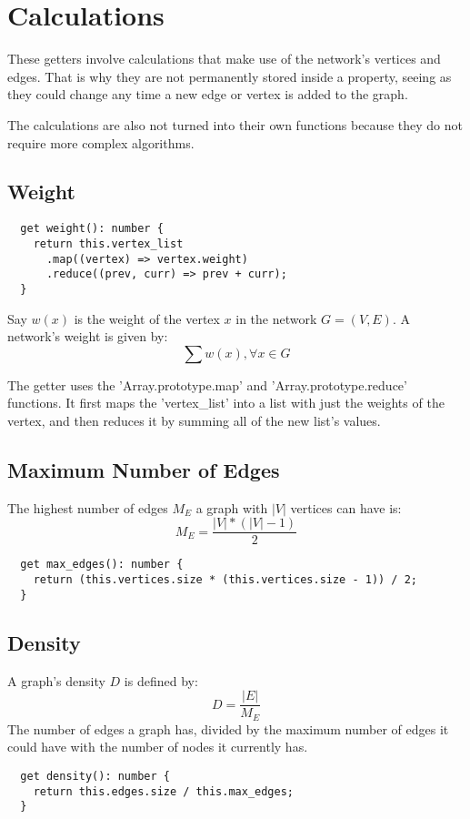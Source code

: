 \section{Calculations}

These getters involve calculations that make use of the network's vertices and edges. That is why they are not permanently stored inside a property, seeing as they could change any time a new edge or vertex is added to the graph.

The calculations are also not turned into their own functions because they do not require more complex algorithms.

\subsection{Weight}

\begin{verbatim}
  get weight(): number {
    return this.vertex_list
      .map((vertex) => vertex.weight)
      .reduce((prev, curr) => prev + curr);
  }
\end{verbatim}

Say $w(x)$ is the weight of the vertex $x$ in the network $G=(V,E)$. A network's weight is given by:
$$\sum{w(x)}, \forall x \in G$$

The getter uses the 'Array.prototype.map' and 'Array.prototype.reduce' functions. It first maps the 'vertex\_list' into a list with just the weights of the vertex, and then reduces it by summing all of the new list's values.

\subsection{Maximum Number of Edges}
The highest number of edges $M_E$ a graph with $|V|$ vertices can have is:
$$M_E=\frac{|V|*(|V|-1)}{2}$$

\begin{verbatim}
  get max_edges(): number {
    return (this.vertices.size * (this.vertices.size - 1)) / 2;
  }
\end{verbatim}

\subsection{Density}

A graph's density $D$ is defined by:
$$D=\frac{|E|}{M_E}$$
The number of edges a graph has, divided by the maximum number of edges it could have with the number of nodes it currently has.

\begin{verbatim}
  get density(): number {
    return this.edges.size / this.max_edges;
  }
\end{verbatim}
